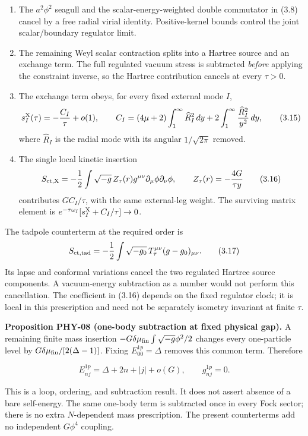 \begin{enumerate}
\def\labelenumi{\arabic{enumi}.}
\tightlist
\item
  The \(a^2\phi^2\) seagull and the scalar-energy-weighted double commutator in (3.8) cancel by a free radial virial identity. Positive-kernel bounds control the joint scalar/boundary regulator limit.
\item
  The remaining Weyl scalar contraction splits into a Hartree source and an exchange term. The full regulated vacuum stress is subtracted \emph{before} applying the constraint inverse, so the Hartree contribution cancels at every \(\tau>0\).
\item
  The exchange term obeys, for every fixed external mode \(I\), \[
  s_I^{\rm X}(\tau)=-\frac{C_I}{\tau}+o(1),\qquad
  C_I=(4\mu+2)\int_1^\infty\widehat R_I^2\,dy
  +2\int_1^\infty\frac{\widehat R_I^2}{y^2}\,dy ,
  \tag{3.15}
  \] where \(\widehat R_I\) is the radial mode with its angular \(1/\sqrt{2\pi}\) removed.
\item
  The single local kinetic insertion \[
  S_{\rm ct,X}=-\frac12\int\sqrt{-g}\,
  Z_\tau(r)g^{\mu\nu}\partial_\mu\phi\partial_\nu\phi,\qquad
  Z_\tau(r)=-\frac{4G}{\tau y}
  \tag{3.16}
  \] contributes \(GC_I/\tau\), with the same external-leg weight. The surviving matrix element is \(e^{-\tau\omega_I}[s_I^{\rm X}+C_I/\tau]\to0\).
\end{enumerate}

The tadpole counterterm at the required order is \[
S_{\rm ct,tad}
=-\frac12\int\sqrt{-g_0}\,T_\tau^{\mu\nu}
(g-g_0)_{\mu\nu}.
\tag{3.17}
\] Its lapse and conformal variations cancel the two regulated Hartree source components. A vacuum-energy subtraction as a number would not perform this cancellation. The coefficient in (3.16) depends on the fixed regulator clock; it is local in this prescription and need not be separately isometry invariant at finite \(\tau\).

\textbf{Proposition PHY-08 (one-body subtraction at fixed physical gap).} A remaining finite mass insertion \(-G\delta\mu_{\rm fin}\int\sqrt{-g}\phi^2/2\) changes every one-particle level by \(G\delta\mu_{\rm fin}/[2(\Delta-1)]\). Fixing \(E_{00}^{1p}=\Delta\) removes this common term. Therefore

\[
\boxed{E_{nj}^{1p}=\Delta+2n+|j|+o(G),\qquad g^{1p}_{nj}=0.}
\tag{3.18}
\]

This is a loop, ordering, and subtraction result. It does not assert absence of a bare self-energy. The same one-body term is subtracted once in every Fock sector; there is no extra \(N\)-dependent mass prescription. The present counterterms add no independent \(G\phi^4\) coupling.

